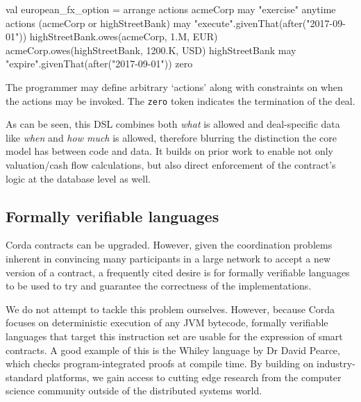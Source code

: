 \documentclass{article}
\begin{document}
\newpage

\begin{kotlincode}
    val european_fx_option = arrange {
        actions {
            acmeCorp may {
                "exercise" anytime {
                    actions {
                        (acmeCorp or highStreetBank) may {
                            "execute".givenThat(after("2017-09-01")) {
                                highStreetBank.owes(acmeCorp, 1.M, EUR)
                                acmeCorp.owes(highStreetBank, 1200.K, USD)
                            }
                        }
                    }
                }
            }
            highStreetBank may {
                "expire".givenThat(after("2017-09-01")) {
                    zero
                }
            }
        }
    }
\end{kotlincode}

The programmer may define arbitrary `actions' along with constraints on when the actions may be invoked. The
\texttt{zero} token indicates the termination of the deal.

As can be seen, this DSL combines both \emph{what} is allowed and deal-specific data like \emph{when} and \emph{how much}
is allowed, therefore blurring the distinction the core model has between code and data. It builds on prior work
to enable not only valuation/cash flow calculations, but also direct enforcement of the contract's logic at the
database level as well.

\subsection{Formally verifiable languages}

Corda contracts can be upgraded. However, given the coordination problems inherent in convincing many participants
in a large network to accept a new version of a contract, a frequently cited desire is for formally verifiable
languages to be used to try and guarantee the correctness of the implementations.

We do not attempt to tackle this problem ourselves. However, because Corda focuses on deterministic execution of
any JVM bytecode, formally verifiable languages that target this instruction set are usable for the expression
of smart contracts. A good example of this is the Whiley language by Dr David Pearce\cite{Pearce2015191}, which
checks program-integrated proofs at compile time. By building on industry-standard platforms, we gain access to
cutting edge research from the computer science community outside of the distributed systems world.
\end{document}
